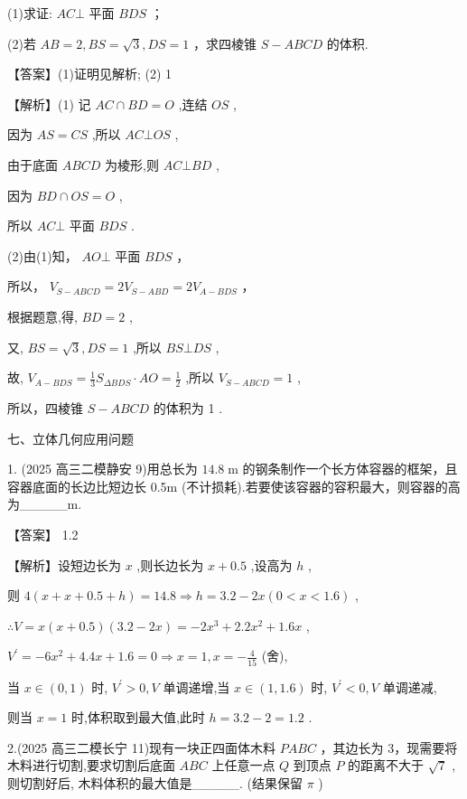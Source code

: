 \documentclass[10pt]{article}
\begin{document}
(1)求证: \({AC}\bot\) 平面 \({BDS}\) ；

(2)若 \({AB} = 2,{BS} = \sqrt{3},{DS} = 1\) ，求四棱锥 \(S - {ABCD}\) 的体积.

【答案】(1)证明见解析; (2) 1

【解析】(1) 记 \({AC} \cap  {BD} = O\) ,连结 \({OS}\) ,

因为 \({AS} = {CS}\) ,所以 \({AC} \bot  {OS}\) ,

由于底面 \({ABCD}\) 为棱形,则 \({AC} \bot  {BD}\) ,

因为 \({BD} \cap  {OS} = O\) ,

所以 \({AC} \bot\) 平面 \({BDS}\) .

(2)由(1)知， \({AO} \bot\) 平面 \({BDS}\) ，

所以， \({V}_{S - {ABCD}} = 2{V}_{S - {ABD}} = 2{V}_{A - {BDS}}\) ，

根据题意,得, \({BD} = 2\) ,

又, \({BS} = \sqrt{3},{DS} = 1\) ,所以 \({BS} \bot  {DS}\) ,

故, \({V}_{A - {BDS}} = \frac{1}{3}{S}_{\Delta BDS} \cdot  {AO} = \frac{1}{2}\) ,所以 \({V}_{S - {ABCD}} = 1\) ,

所以，四棱锥 \(S - {ABCD}\) 的体积为 1 .

七、立体几何应用问题

1. (2025 高三二模静安 9)用总长为 \({14.8}\mathrm{\;m}\) 的钢条制作一个长方体容器的框架，且容器底面的长边比短边长 0.5m (不计损耗).若要使该容器的容积最大，则容器的高为\_\_\_\_\_m.

【答案】 1.2

【解析】设短边长为 \(x\) ,则长边长为 \(x + {0.5}\) ,设高为 \(h\) ,

则 \(4\left( {x + x + {0.5} + h}\right)  = {14.8} \Rightarrow  h = {3.2} - {2x}\left( {0 < x < {1.6}}\right)\) ,

\(\therefore V = x\left( {x + {0.5}}\right) \left( {{3.2} - {2x}}\right)  =  - 2{x}^{3} + {2.2}{x}^{2} + {1.6x}\) ,

\({V}^{\prime } =  - 6{x}^{2} + {4.4x} + {1.6} = 0 \Rightarrow  x = 1,x =  - \frac{4}{15}\) (舍),

当 \(x \in  \left( {0,1}\right)\) 时, \({V}^{\prime } > 0,V\) 单调递增,当 \(x \in  \left( {1,{1.6}}\right)\) 时, \({V}^{\prime } < 0,V\) 单调递减,

则当 \(x = 1\) 时,体积取到最大值,此时 \(h = {3.2} - 2 = {1.2}\) .

2.(2025 高三二模长宁 11)现有一块正四面体木料 \({PABC}\) ，其边长为 3，现需要将木料进行切割,要求切割后底面 \({ABC}\) 上任意一点 \(Q\) 到顶点 \(P\) 的距离不大于 \(\sqrt{7}\) ,则切割好后, 木料体积的最大值是\_\_\_\_\_. (结果保留 \(\pi\) )
\end{document}

